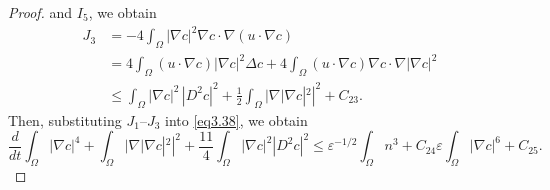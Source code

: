 \documentclass[10pt,a4paper]{amsart}
\numberwithin{equation}{section}
\begin{document}
\begin{proof}
and $I_5$, we obtain
\begin{align*}
J_3 
&= - 4 \int_{\Omega} |\nabla c|^2 \nabla c \cdot \nabla (u \cdot \nabla c) \\&=4 \int_{\Omega} (u \cdot \nabla c) |\nabla c|^2 \Delta c
+ 4 \int_{\Omega} (u \cdot \nabla c) \nabla c \cdot \nabla |\nabla c|^2\\
&\leq \int_{\Omega} |\nabla c|^2 \, |D^2 c|^2 + \frac{1}{2} \int_{\Omega} |\nabla |\nabla c|^2|^2 + C_{23}.
\end{align*}
Then, substituting $J_1$--$J_3$ into \eqref{eq3.38}, we obtain
\begin{equation}\label{(3.57)}
\frac{d}{dt} \int_{\Omega} |\nabla c|^4
+ \int_{\Omega} |\nabla |\nabla c|^2|^2
+ \frac{11}{4}\int_{\Omega} |\nabla c|^2 |D^2 c|^2 
\leq \varepsilon^{-1/2}\int_{\Omega} n^3+ C_{24}\varepsilon\int_{\Omega} |\nabla c|^6
+ C_{25}.
\end{equation}


\end{proof}
\end{document}

